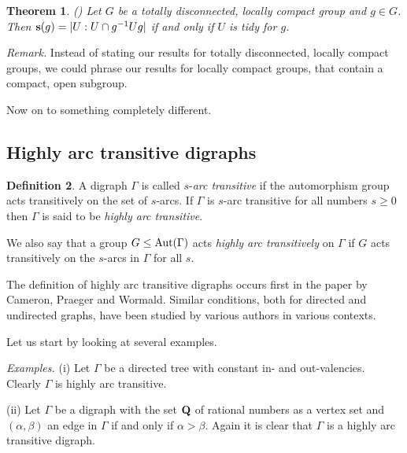 \documentclass{emsprocart}
\newtheorem{theorem}{Theorem}[section]
\theoremstyle{definition}
\newtheorem{definition}[theorem]{Definition}
\begin{document}
\begin{theorem}
\label{TScaletidy}
{\rm (\cite[Theorem 3.1]{Willis2001a})}
Let $G$ be a totally disconnected, locally compact group and $g\in G$.
Then ${\mbox{\bf s}}(g)=|U:U\cap g^{-1}Ug|$ if and only if $U$ is tidy for $g$.
\end{theorem}

{\em Remark.}   Instead of stating our results for totally disconnected, locally compact groups, we could phrase our results for  locally compact groups, that contain a compact, open subgroup.

\medskip

Now on to something completely different.

\subsection{Highly arc transitive digraphs}\label{Shat}
\begin{definition}
  A digraph $\Gamma$ is called $s$-{\em arc transitive} if the
  automorphism group acts transitively on the set of  $s$-arcs.   If $\Gamma$ is $s$-arc transitive for all numbers $s\geq 0$
  then $\Gamma$ is said to be {\em highly arc transitive}.
\end{definition}

We also say that a group $G\leq {\mbox{${\rm Aut}(\Gamma)$}}$ acts {\em highly arc transitively}
  on $\Gamma$ if $G$ acts transitively on the $s$-arcs in $\Gamma$ for
  all $s$.

  The definition of highly arc transitive digraphs occurs first in the
  paper  \cite{CPW1993} by Cameron, Praeger and
  Wormald.  Similar conditions, both for directed and undirected
  graphs,  have been studied by various authors in various contexts.

Let us start by looking at several examples.

\bigskip

{\em Examples.}  (i)  Let $\Gamma$ be a directed tree with constant
in- and out-valencies.  Clearly $\Gamma$ is highly arc transitive.

(ii)  Let $\Gamma$ be a digraph with the set ${\mbox{\bf Q}}$ of rational numbers
as a vertex set and $(\alpha, \beta)$ an edge in $\Gamma$ if and only
if $\alpha >\beta$.  Again it is clear that $\Gamma$ is a highly arc
transitive digraph.
\end{document}
